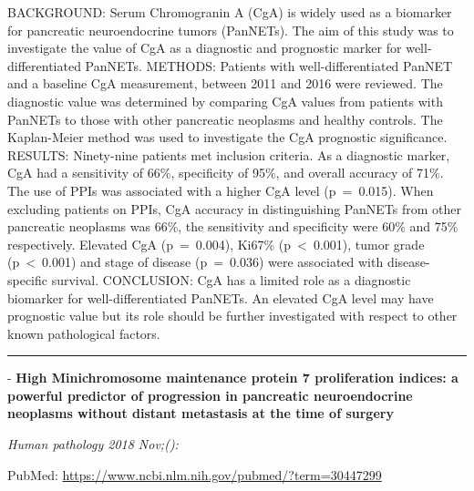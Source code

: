 \documentclass[]{article}
\begin{document}
BACKGROUND: Serum Chromogranin A (CgA) is widely used as a biomarker for
pancreatic neuroendocrine tumors (PanNETs). The aim of this study was to
investigate the value of CgA as a diagnostic and prognostic marker for
well-differentiated PanNETs. METHODS: Patients with well-differentiated
PanNET and a baseline CgA measurement, between 2011 and 2016 were
reviewed. The diagnostic value was determined by comparing CgA values
from patients with PanNETs to those with other pancreatic neoplasms and
healthy controls. The Kaplan-Meier method was used to investigate the
CgA prognostic significance. RESULTS: Ninety-nine patients met inclusion
criteria. As a diagnostic marker, CgA had a sensitivity of 66\%,
specificity of 95\%, and overall accuracy of 71\%. The use of PPIs was
associated with a higher CgA level (p~=~0.015). When excluding patients
on PPIs, CgA accuracy in distinguishing PanNETs from other pancreatic
neoplasms was 66\%, the sensitivity and specificity were 60\% and 75\%
respectively. Elevated CgA (p~=~0.004), Ki67\% (p~\textless{}~0.001),
tumor grade (p~\textless{}~0.001) and stage of disease (p~=~0.036) were
associated with disease-specific survival. CONCLUSION: CgA has a limited
role as a diagnostic biomarker for well-differentiated PanNETs. An
elevated CgA level may have prognostic value but its role should be
further investigated with respect to other known pathological factors.

{}

{}

\begin{center}\rule{0.5\linewidth}{\linethickness}\end{center}

 - \textbf{High Minichromosome maintenance protein 7 proliferation
indices: a powerful predictor of progression in pancreatic
neuroendocrine neoplasms without distant metastasis at the time of
surgery}

\emph{Human pathology 2018 Nov;():}

PubMed: \url{https://www.ncbi.nlm.nih.gov/pubmed/?term=30447299}
\end{document}
